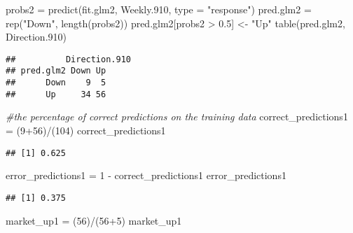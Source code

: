 \documentclass[
]{article}
\newenvironment{Shaded}{\begin{snugshade}}{\end{snugshade}}
\newcommand{\AttributeTok}[1]{\textcolor[rgb]{0.77,0.63,0.00}{#1}}
\newcommand{\CommentTok}[1]{\textcolor[rgb]{0.56,0.35,0.01}{\textit{#1}}}
\newcommand{\DecValTok}[1]{\textcolor[rgb]{0.00,0.00,0.81}{#1}}
\newcommand{\FloatTok}[1]{\textcolor[rgb]{0.00,0.00,0.81}{#1}}
\newcommand{\FunctionTok}[1]{\textcolor[rgb]{0.00,0.00,0.00}{#1}}
\newcommand{\NormalTok}[1]{#1}
\newcommand{\OtherTok}[1]{\textcolor[rgb]{0.56,0.35,0.01}{#1}}
\newcommand{\SpecialCharTok}[1]{\textcolor[rgb]{0.00,0.00,0.00}{#1}}
\newcommand{\StringTok}[1]{\textcolor[rgb]{0.31,0.60,0.02}{#1}}
\begin{document}
\begin{Shaded}
\begin{Highlighting}[]
\NormalTok{probs2 }\OtherTok{=} \FunctionTok{predict}\NormalTok{(fit.glm2, Weekly}\FloatTok{.910}\NormalTok{, }\AttributeTok{type =} \StringTok{"response"}\NormalTok{)}
\NormalTok{pred.glm2 }\OtherTok{=} \FunctionTok{rep}\NormalTok{(}\StringTok{"Down"}\NormalTok{, }\FunctionTok{length}\NormalTok{(probs2))}
\NormalTok{pred.glm2[probs2 }\SpecialCharTok{\textgreater{}} \FloatTok{0.5}\NormalTok{] }\OtherTok{\textless{}{-}} \StringTok{"Up"}
\FunctionTok{table}\NormalTok{(pred.glm2, Direction}\FloatTok{.910}\NormalTok{)}
\end{Highlighting}
\end{Shaded}

\begin{verbatim}
##          Direction.910
## pred.glm2 Down Up
##      Down    9  5
##      Up     34 56
\end{verbatim}

\begin{Shaded}
\begin{Highlighting}[]
\CommentTok{\#the percentage of correct predictions on the training data}
\NormalTok{correct\_predictions1 }\OtherTok{=}\NormalTok{ (}\DecValTok{9}\SpecialCharTok{+}\DecValTok{56}\NormalTok{)}\SpecialCharTok{/}\NormalTok{(}\DecValTok{104}\NormalTok{)}
\NormalTok{correct\_predictions1}
\end{Highlighting}
\end{Shaded}

\begin{verbatim}
## [1] 0.625
\end{verbatim}

\begin{Shaded}
\begin{Highlighting}[]
\NormalTok{error\_predictions1 }\OtherTok{=} \DecValTok{1} \SpecialCharTok{{-}}\NormalTok{ correct\_predictions1}
\NormalTok{error\_predictions1}
\end{Highlighting}
\end{Shaded}

\begin{verbatim}
## [1] 0.375
\end{verbatim}

\begin{Shaded}
\begin{Highlighting}[]
\NormalTok{market\_up1 }\OtherTok{=}\NormalTok{ (}\DecValTok{56}\NormalTok{)}\SpecialCharTok{/}\NormalTok{(}\DecValTok{56}\SpecialCharTok{+}\DecValTok{5}\NormalTok{)}
\NormalTok{market\_up1}
\end{Highlighting}
\end{Shaded}
\end{document}
